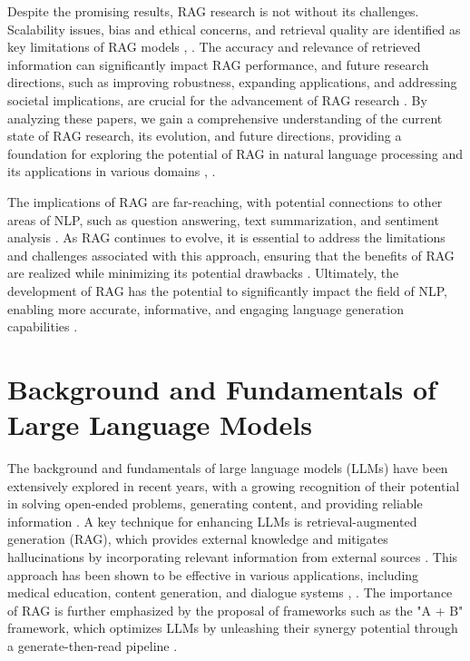 \documentclass[conference]{IEEEtran}
\begin{document}
Despite the promising results, RAG research is not without its challenges. Scalability issues, bias and ethical concerns, and retrieval quality are identified as key limitations of RAG models \cite{b14}, \cite{b15}. The accuracy and relevance of retrieved information can significantly impact RAG performance, and future research directions, such as improving robustness, expanding applications, and addressing societal implications, are crucial for the advancement of RAG research \cite{b16}. By analyzing these papers, we gain a comprehensive understanding of the current state of RAG research, its evolution, and future directions, providing a foundation for exploring the potential of RAG in natural language processing and its applications in various domains \cite{b17}, \cite{b18}. 

The implications of RAG are far-reaching, with potential connections to other areas of NLP, such as question answering, text summarization, and sentiment analysis \cite{b19}. As RAG continues to evolve, it is essential to address the limitations and challenges associated with this approach, ensuring that the benefits of RAG are realized while minimizing its potential drawbacks \cite{b20}. Ultimately, the development of RAG has the potential to significantly impact the field of NLP, enabling more accurate, informative, and engaging language generation capabilities \cite{b21}.

\section{Background and Fundamentals of Large Language Models}
The background and fundamentals of large language models (LLMs) have been extensively explored in recent years, with a growing recognition of their potential in solving open-ended problems, generating content, and providing reliable information \cite{b1}. A key technique for enhancing LLMs is retrieval-augmented generation (RAG), which provides external knowledge and mitigates hallucinations by incorporating relevant information from external sources \cite{b2}. This approach has been shown to be effective in various applications, including medical education, content generation, and dialogue systems \cite{b3}, \cite{b4}. The importance of RAG is further emphasized by the proposal of frameworks such as the "A + B" framework, which optimizes LLMs by unleashing their synergy potential through a generate-then-read pipeline \cite{b5}.
\end{document}
